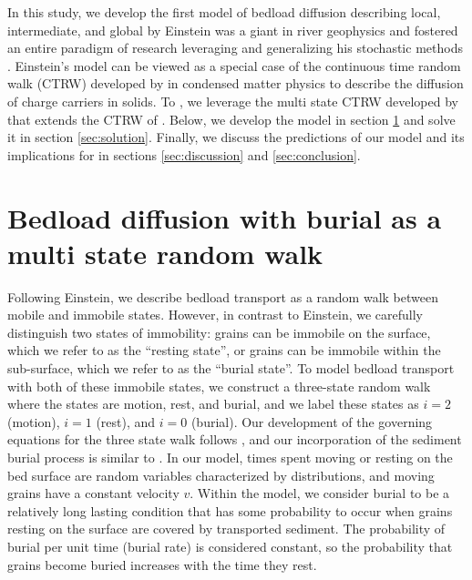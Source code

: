 \documentclass[draft,grl]{agujournal2018}
\begin{document}
In this study, we develop the first model of bedload diffusion describing local, intermediate, and global  by 
Einstein was a giant in river geophysics and fostered an entire paradigm of research leveraging and generalizing his stochastic methods \citep[e.g.,][]{Hubbell1964, Yano1969, Yang1971, Gordon1972, Nakagawa1976}.
Einstein's model can be viewed as a special case of the continuous time random walk (CTRW) developed by \citet{Montroll1965} in condensed matter physics to describe the diffusion of charge carriers in solids.
To , we leverage the multi state CTRW developed by \citet{Weiss1976, Weiss1994} that extends the CTRW of \citet{Montroll1965}.
Below, we develop the model in section \ref{sec:model} and solve it in section \ref{sec:solution}. Finally, we discuss the predictions of our model and its implications for  in sections \ref{sec:discussion} and \ref{sec:conclusion}.

\section{Bedload diffusion with burial as a multi state random walk}
\label{sec:model}

Following Einstein, we describe bedload transport as a random walk between mobile and immobile states.
However, in contrast to Einstein, we carefully distinguish two states of immobility: grains can be immobile on the surface, which we refer to as the ``resting state'', or grains can be immobile within the sub-surface, which we refer to as the ``burial state''.
To model bedload transport with both of these immobile states, we construct a three-state random walk where the states are motion, rest, and burial, and we label these states as $i=2$ (motion), $i=1$ (rest), and $i=0$ (burial).
Our development of the governing equations for the three state walk follows \citet{Weiss1994}, and our incorporation of the sediment burial process is similar to \citet{Schmidt2007}.
In our model, times spent moving or resting on the bed surface are random variables characterized by  distributions, and moving grains have a constant velocity $v$.
Within the model, we consider burial to be a relatively long lasting condition that has some probability to occur when grains resting on the surface are covered by transported sediment.
The probability of burial per unit time (burial rate) is considered constant, so the probability that grains become buried increases with the time they rest.
\end{document}
